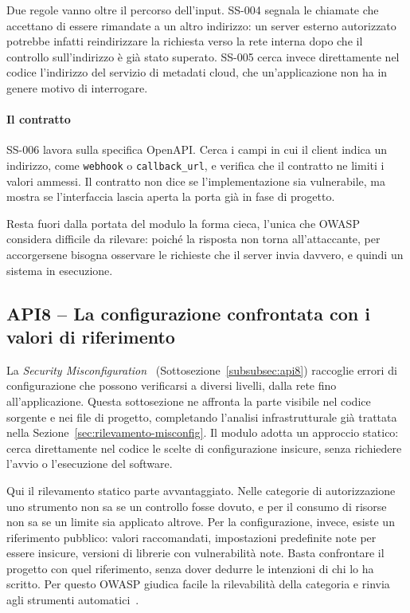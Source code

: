 Due regole vanno oltre il percorso dell'input. SS-004 segnala le chiamate che
accettano di essere rimandate a un altro indirizzo: un server esterno
autorizzato potrebbe infatti reindirizzare la richiesta verso la rete interna
dopo che il controllo sull'indirizzo è già stato superato. SS-005 cerca invece
direttamente nel codice l'indirizzo del servizio di metadati cloud, che
un'applicazione non ha in genere motivo di interrogare.

\paragraph{Il contratto}
SS-006 lavora sulla specifica OpenAPI. Cerca i campi in cui il client indica
un indirizzo, come \texttt{webhook} o \texttt{callback\_url}, e verifica che il
contratto ne limiti i valori ammessi. Il contratto non dice se
l'implementazione sia vulnerabile, ma mostra se l'interfaccia lascia aperta la
porta già in fase di progetto.

Resta fuori dalla portata del modulo la forma cieca, l'unica che OWASP
considera difficile da rilevare: poiché la risposta non torna all'attaccante,
per accorgersene bisogna osservare le richieste che il server invia davvero, e
quindi un sistema in esecuzione.

\subsection{API8 -- La configurazione confrontata con i valori di riferimento}
\label{sec:rilevamento-secmisconfig}

La \emph{Security Misconfiguration}~\cite{owasp2023api8}
(Sottosezione~\ref{subsubsec:api8}) raccoglie errori di configurazione che
possono verificarsi a diversi livelli, dalla rete fino all'applicazione. Questa
sottosezione ne affronta la parte visibile nel codice sorgente e nei file di
progetto, completando l'analisi infrastrutturale già trattata nella
Sezione~\ref{sec:rilevamento-misconfig}. Il modulo adotta un approccio statico:
cerca direttamente nel codice le scelte di configurazione insicure, senza
richiedere l'avvio o l'esecuzione del software.

Qui il rilevamento statico parte avvantaggiato. Nelle categorie di
autorizzazione uno strumento non sa se un controllo fosse dovuto, e per il
consumo di risorse non sa se un limite sia applicato altrove. Per la
configurazione, invece, esiste un riferimento pubblico: valori raccomandati,
impostazioni predefinite note per essere insicure, versioni di librerie con
vulnerabilità note. Basta confrontare il progetto con quel riferimento, senza
dover dedurre le intenzioni di chi lo ha scritto. Per questo OWASP giudica
facile la rilevabilità della categoria e rinvia agli strumenti
automatici~\cite{owasp2023api8}.


